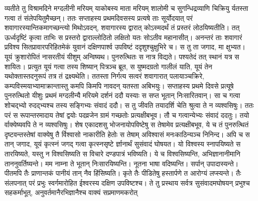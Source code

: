 \adhyAya
{}
\vakya व्यतीते तु विश्रामदिने मग्दलीनी मरियम् याकोबस्य माता मरियम् शालोमी च सुगन्धिद्रव्याणि चिक्रियु र्यतस्ता गत्वा तं संलेपयितुमैच्छन्।
\vakya ततः सप्ताहस्य प्रथमदिवसस्य प्रत्यषे ताः सूर्योदयात् परं शवागारस्यान्तिकमागच्छन्त्यो मिथोऽवदन्, शवागारस्य द्वारात् कोऽस्मदर्थं तं प्रस्तरं लोठयिष्यतीति।
\vakya तत् ऊर्ध्वदृष्टिं कृत्वा ताभिः स प्रस्तरो द्वाराल्लोठितो लक्षितो यतः सोऽतीव महानासीत्।
\vakya अनन्तरं ताः शवागारं प्रविश्य सितप्रावारपरिहितमेकं युवानं दक्षिणपार्श्व उपविष्टं ददृशुश्चुक्षुभिरे च।
\vakya स तु ता जगाद, मा क्षुभ्यत। यूयं क्रुशारोपितं नासरतीयं यीशुम् अन्विष्यथ।
\vakya पुनरुत्थितः स नात्र विद्यते। पश्यतेदं तत् स्थानं यत्र स शायितः।
\vakya प्रत्युत यूयं गत्वा तस्य शिष्यान् पित्रञ्च ब्रूत, स युष्मदग्रतो गालीलं याति, यूयं तेन यथोक्तास्तदनुरूपं तत्र तं द्रक्ष्यथेति।
\vakya ततस्ता निर्गत्य सत्वरं शवागारात् पलायाञ्चक्रिरे, कम्पविस्मयाभ्यामाक्रान्तास्तु कमपि किमपि नावदन् यतस्ता अबिभयुः।
\vakya सप्ताहस्य प्रथमे दिवसे प्रत्यूषे पुनरुत्थितो यीशुः प्रथमं मग्दलीन्यै मरियमे दर्शनं ददौ यस्याः स सप्त भूतान् निःसारितवान्।
\vakya सा च गत्वा शोचद्भ्यो रुदद्भ्यश्च तस्य सङ्गिभ्यः संवादं ददौ।
\vakya स तु जीवति तयादर्शि चेति श्रुत्वा ते न व्यश्वसिषुः।
\vakya ततः परं स रूपान्तरमादाय तेषां द्वयोः पदव्रजेन ग्रामं गच्छतोः प्रत्यक्षीबभूव।
\vakya तौ च गत्वान्येभ्यः संवादं ददतुः। तयो र्वाक्येष्यवपि ते न व्यश्वसिषुः।
\vakya शेष एकादशसु भोजनायोपविष्टेषु स तेषामेव प्रत्यक्षीबभूव, ये च तं पुनरुत्थितं दृष्टवन्तस्तेषां वाक्येषु तै र्विश्वासो नाकारीति हेतोः स तेषाम् अविश्वासं मनःकाठिन्यञ्च निनिन्द।
\vakya अपि च स तान् जगाद, यूयं कृत्स्नं जगद् गत्वा कृत्स्नसृष्टे र्ज्ञानार्थं सुसंवादं घोषयत।
\vakya यो विश्वस्य स्नापयिष्यते स तारयिष्यते, यस्तु न विश्वसिष्यति स विचारे दण्डपात्रं भविष्यति।
\vakya ये च विश्वसिष्यन्ति, अभिज्ञानानीमानि ताननुवर्तिष्यन्ते। मम नाम्ना ते भूतान् निःसारयिष्यन्ति। नूतना भाषा वदिष्यन्ति।
\vakya सर्पान् उपादास्यन्ते। पीतमपि तैः प्राणान्तकं पानीयं तान् नैव हिंसिष्यति। कृते तैः पीडितेषु हस्तार्पणे त आरोग्यं लप्स्यन्ते।
\vakya तैः संलपनात् परं प्रभुः स्वर्गमारोहित ईश्वरस्य दक्षिण उपविष्टश्च।
\vakya ते तु प्रस्थाय सर्वत्र सुसंवादमघोषयन् प्रभुश्च सहकर्माभूत्, अनुवर्तमानैरभिज्ञानैश्च वाक्यं सप्रमाणमकरोत्\eoc